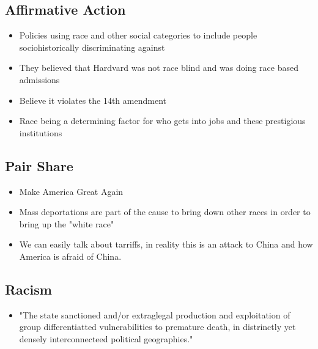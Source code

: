 \documentclass{article}
\begin{document}
\subsection{Affirmative Action}
\begin{itemize}
  \item Policies using race and other social categories to include people sociohistorically 
    discriminating against
  \item They believed that Hardvard was not race blind and was doing race based admissions
  \item Believe it violates the 14th amendment
  \item Race being a determining factor for who gets into jobs and these prestigious institutions
\end{itemize}

\subsection{Pair Share}
\begin{itemize}
  \item Make America Great Again
  \item Mass deportations are part of the cause to bring down other races in order to bring up the "white race"
  \item We can easily talk about tarriffs, in reality this is an attack to China and how America is afraid of China.
\end{itemize}

\subsection{Racism}
\begin{itemize}
  \item "The state sanctioned and/or extraglegal production and exploitation of group 
    differentiatted vulnerabilities to premature death, in distrinctly yet 
    densely interconnecteed political geographies."
\end{itemize}
\end{document}
